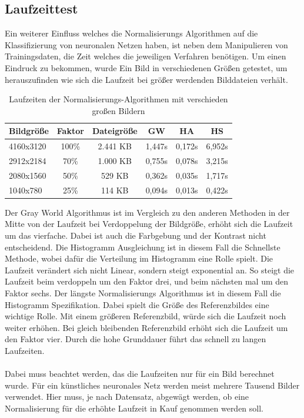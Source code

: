 \documentclass[a4paper,12pt,oneside]{article}
\begin{document}
\subsection{Laufzeittest}
Ein weiterer Einfluss welches die Normalisierungs Algorithmen auf die Klassifizierung von neuronalen Netzen haben, ist neben dem Manipulieren von Trainingsdaten, die Zeit welches die jeweiligen Verfahren benötigen. Um einen Eindruck zu bekommen, wurde Ein Bild in verschiedenen Größen getestet, um herauszufinden wie sich die Laufzeit bei größer werdenden Bilddateien verhält.
\begin{table}
[h]
\caption{Laufzeiten der Normalisierungs-Algorithmen mit verschieden großen Bildern}
\centering
\begin{tabular}{|l|c|c|c|c|c|}
\hline
Bildgröße & Faktor & Dateigröße & GW & HA & HS\\
\hline
4160x3120 & 100\% & 2.441 KB & 1,447s & 0,172s & 6,952s\\
2912x2184 & 70\% & 1.000 KB & 0,755s & 0,078s & 3,215s\\
2080x1560 & 50\% & 529 KB & 0,362s & 0,035s & 1,717s\\
1040x780 & 25\% & 114 KB & 0,094s & 0,013s & 0,422s\\
\hline
\end{tabular}
\end{table}
Der Gray World Algorithmus ist im Vergleich zu den anderen Methoden in der Mitte von der Laufzeit bei Verdoppelung der Bildgröße, erhöht sich die Laufzeit um das vierfache. Dabei ist auch die Farbgebung und der Kontrast nicht entscheidend. Die Histogramm Ausgleichung ist in diesem Fall die Schnellste Methode, wobei dafür die Verteilung im Histogramm eine Rolle spielt. Die Laufzeit verändert sich nicht Linear, sondern steigt exponential an. So steigt die Laufzeit beim verdoppeln um den Faktor drei, und beim nächsten mal um den Faktor sechs. Der längste Normalisierungs Algorithmus ist in diesem Fall die Histogramm Spezifikation. Dabei spielt die Größe des Referenzbildes eine wichtige Rolle. Mit einem größeren Referenzbild, würde sich die Laufzeit noch weiter erhöhen. Bei gleich bleibenden Referenzbild erhöht sich die Laufzeit um den Faktor vier. Durch die hohe Grunddauer führt das schnell zu langen Laufzeiten.\\\\
Dabei muss beachtet werden, das die Laufzeiten nur für ein Bild berechnet wurde. Für ein künstliches neuronales Netz werden meist mehrere Tausend Bilder verwendet. Hier muss, je nach Datensatz, abgewägt werden, ob eine Normalisierung für die erhöhte Laufzeit in Kauf genommen werden soll.
\newpage   
\end{document}
